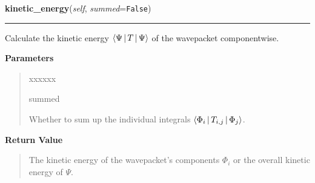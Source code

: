 \hspace{.8\funcindent}\begin{boxedminipage}{\funcwidth}

    \raggedright \textbf{kinetic\_energy}(\textit{self}, \textit{summed}={\tt False})

    \vspace{-1.5ex}

    \rule{\textwidth}{0.5\fboxrule}
\setlength{\parskip}{2ex}
    Calculate the kinetic energy
    $\Braket{\Psi|T|\Psi}$
    of the wavepacket componentwise.

\setlength{\parskip}{1ex}
      \textbf{Parameters}
      \vspace{-1ex}

      \begin{quote}
        \begin{Ventry}{xxxxxx}

          \item[summed]

          Whether to sum up the individual integrals
          $\Braket{\Phi_i|T_{i,j}|\Phi_j}$.

        \end{Ventry}

      \end{quote}

      \textbf{Return Value}
    \vspace{-1ex}

      \begin{quote}
      The kinetic energy of the wavepacket's components
      $\Phi_i$ or the overall kinetic energy of
      $\Psi$.

      \end{quote}

    \end{boxedminipage}

    \label{HagedornMultiWavepacket:HagedornMultiWavepacket:grady}

    \vspace{0.5ex}

